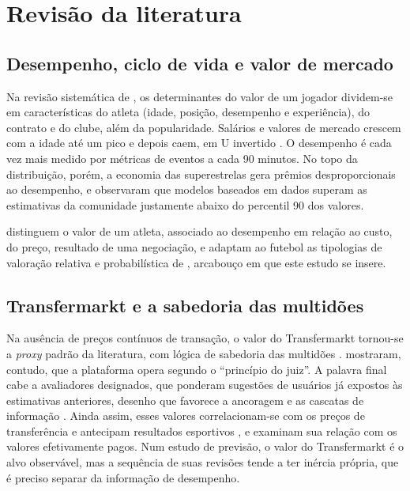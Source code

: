 \documentclass[article, 12pt, oneside, a4paper, english, brazil, section=TITLE]{abntex2}
\begin{document}
\section{Revisão da literatura}

\subsection{Desempenho, ciclo de vida e valor de mercado}

Na revisão sistemática de \textcite{franceschi2024}, os determinantes do valor de um jogador dividem-se em características do atleta (idade, posição, desempenho e experiência), do contrato e do clube, além da popularidade.
Salários e valores de mercado crescem com a idade até um pico e depois caem, em U invertido \cite{frick2007}.
O desempenho é cada vez mais medido por métricas de eventos a cada 90 minutos.
No topo da distribuição, porém, a economia das superestrelas \cite{rosen1981,lucifora2003} gera prêmios desproporcionais ao desempenho, e \textcite{muller2017} observaram que modelos baseados em dados superam as estimativas da comunidade justamente abaixo do percentil 90 dos valores.

\textcite{hill2026} distinguem o valor de um atleta, associado ao desempenho em relação ao custo, do preço, resultado de uma negociação, e adaptam ao futebol as tipologias de valoração relativa e probabilística de \textcite{damodaran2012}, arcabouço em que este estudo se insere.

\subsection{Transfermarkt e a sabedoria das multidões}

Na ausência de preços contínuos de transação, o valor do Transfermarkt tornou-se a \textit{proxy} padrão da literatura, com lógica de sabedoria das multidões \cite{surowiecki2004}.
\textcite{herm2014} mostraram, contudo, que a plataforma opera segundo o \enquote{princípio do juiz}.
A palavra final cabe a avaliadores designados, que ponderam sugestões de usuários já expostos às estimativas anteriores, desenho que favorece a ancoragem \cite{tversky1974} e as cascatas de informação \cite{bikhchandani1992}.
Ainda assim, esses valores correlacionam-se com os preços de transferência e antecipam resultados esportivos \cite{herm2014,peeters2018}, e \textcite{coates2022} examinam sua relação com os valores efetivamente pagos.
Num estudo de previsão, o valor do Transfermarkt é o alvo observável, mas a sequência de suas revisões tende a ter inércia própria, que é preciso separar da informação de desempenho.
\end{document}
